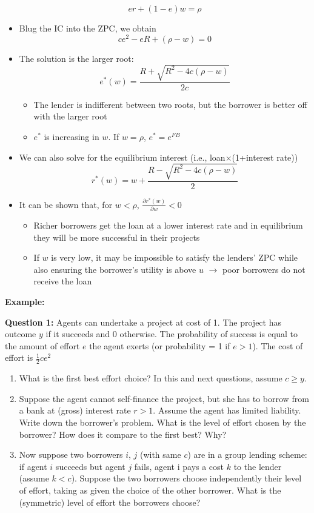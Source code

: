 \documentclass[a4paper]{article}
\begin{document}
\begin{itemize}
    \[er+(1-e)w=\rho \]
    \item Blug the IC into the ZPC, we obtain
    \[ce^2-eR+(\rho-w)=0 \]
    \item The solution is the larger root:
    \[e^*(w)=\frac{R+\sqrt{R^2-4c(\rho-w)}}{2c} \]
    \begin{itemize}
        \item The lender is indifferent between two roots, but the borrower is better off with the larger root
        \item $e^*$ is increasing in $w$. If $w=\rho$, $e^*=e^{FB}$
    \end{itemize}
    \item We can also solve for the equilibrium interest (i.e., loan$\times$(1+interest rate))
    \[r^*(w)=w+\frac{R-\sqrt{R^2-4c(\rho-w)}}{2} \]
    \item It can be shown that, for $w<\rho$, $\frac{\partial r^*(w)}{\partial w}<0$
    \begin{itemize}
        \item Richer borrowers get the loan at a lower interest rate and in equilibrium they will be more successful in their projects
        \item If $w$ is very low, it may be impossible to satisfy the lenders' ZPC while also ensuring the borrower's utility is above $u$ $\to$ poor borrowers do not receive the loan
    \end{itemize}
\end{itemize}

\textbf{Example:}

\textbf{Question 1:} Agents can undertake a project at cost of 1. The project has outcome $y$ if it succeeds and 0 otherwise. The probability of success is equal to the amount of effort $e$ the agent exerts (or probability = 1 if $e>1$). The cost of effort is $\frac{1}{2}ce^2$
\begin{enumerate}
    \item What is the first best effort choice? In this and next questions, assume $c\geq y$.
    \item Suppose the agent cannot self-finance the project, but she has to borrow from a bank at (gross) interest rate $r>1$. Assume the agent has limited liability. Write down the borrower’s problem. What is the level of effort chosen by the borrower? How does it compare to the first best? Why?
    \item Now suppose two borrowers $i$, $j$ (with same $c$) are in a group lending scheme: if agent $i$ succeeds but agent $j$ fails, agent i pays a cost $k$ to the lender (assume $k<c$). Suppose the two borrowers choose independently their level of effort, taking as given the choice of the other borrower. What is the (symmetric) level of effort the borrowers choose?
\end{enumerate}
\end{document}
